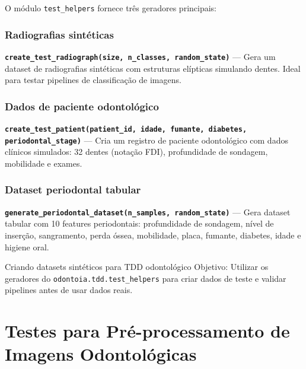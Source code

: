 O módulo \texttt{test\_helpers} fornece três geradores principais:

\subsubsection{Radiografias sintéticas}

\textbf{\texttt{create\_test\_radiograph(size, n\_classes, random\_state)}}
— Gera um dataset de radiografias sintéticas com estruturas elípticas
simulando dentes. Ideal para testar pipelines de classificação de imagens.

\subsubsection{Dados de paciente odontológico}

\textbf{\texttt{create\_test\_patient(patient\_id, idade, fumante, diabetes, periodontal\_stage)}}
— Cria um registro de paciente odontológico com dados clínicos simulados:
32 dentes (notação FDI), profundidade de sondagem, mobilidade e exames.

\subsubsection{Dataset periodontal tabular}

\textbf{\texttt{generate\_periodontal\_dataset(n\_samples, random\_state)}}
— Gera dataset tabular com 10 features periodontais: profundidade de
sondagem, nível de inserção, sangramento, perda óssea, mobilidade, placa,
fumante, diabetes, idade e higiene oral.

\begin{pratica}{Criando datasets sintéticos para TDD odontológico}
  Objetivo: Utilizar os geradores do \texttt{odontoia.tdd.test\_helpers}
  para criar dados de teste e validar pipelines antes de usar dados reais.
\end{pratica}



\section{Testes para Pré-processamento de Imagens Odontológicas}

